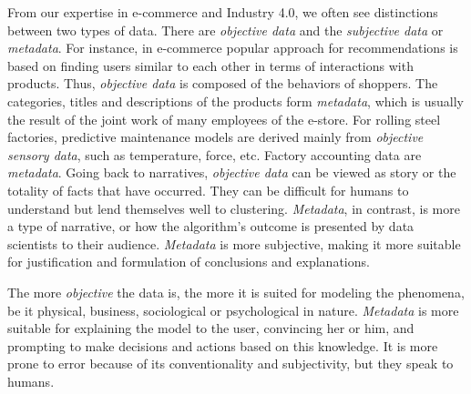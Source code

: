 \documentclass[
 twocolumn,
 hf,
]{ceurart}
\begin{document}
From our expertise in e-commerce and Industry 4.0, we often see distinctions between two types of data.
There are \textit{objective data} and the \textit{subjective data} or \textit{metadata}.
For instance, in e-commerce popular approach for recommendations is based on finding users similar to each other in terms of interactions with products.
Thus, \textit{objective data} is composed of the behaviors of shoppers.
The categories, titles and descriptions of the products form \textit{metadata}, which is usually the result of the joint work of many employees of the e-store.
For rolling steel factories, predictive maintenance models are derived mainly from \textit{objective sensory data}, such as temperature, force, etc.
Factory accounting data are \textit{metadata}.
Going back to narratives, \textit{objective data} can be viewed as story or the totality of facts that have occurred.
They can be difficult for humans to understand but lend themselves well to clustering.
\textit{Metadata}, in contrast, is more a type of narrative, or how the algorithm's outcome is presented by data scientists to their audience.
\textit{Metadata} is more subjective, making it more suitable for justification and formulation of conclusions and explanations.

The more \textit{objective} the data is, the more it is suited for modeling the phenomena, be it physical, business, sociological or psychological in nature.
\textit{Metadata} is more suitable for explaining the model to the user, convincing her or him, and prompting to make decisions and actions based on this knowledge.
It is more prone to error because of its conventionality and subjectivity, but they speak to humans.
\end{document}
